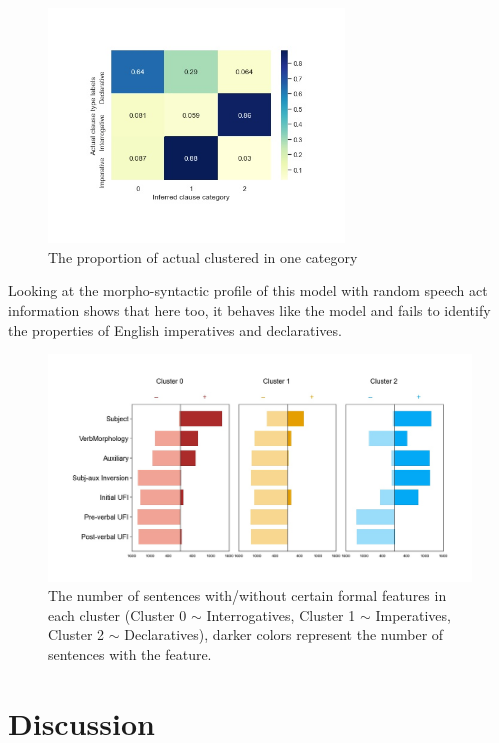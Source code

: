 \begin{figure}[H]
    \centering
    \includegraphics[width=0.7\textwidth]{figures/noisy100-heatrev.jpg}
    \caption{The proportion of actual \diis{} clustered in one category}
    \label{fig:noisy100-heatrev}
\end{figure}

Looking at the morpho-syntactic profile of this model with random speech act information shows that here too, it behaves like the \dlearnerabbr{} model and fails to identify the properties of English imperatives and declaratives.

\begin{figure}[H]
    \centering
    \includegraphics[width=1\textwidth]{figures/noisy100-syncluster.jpg}
    \caption{The number of sentences with/without certain formal features in each cluster (Cluster 0 $\sim$ Interrogatives, Cluster 1 $\sim$ Imperatives, Cluster 2 $\sim$ Declaratives), darker colors represent the number of sentences with the feature.}
    \label{fig:noisy100-syncluster}
\end{figure}


\section{Discussion}
\label{sec:mancl:discussion}

